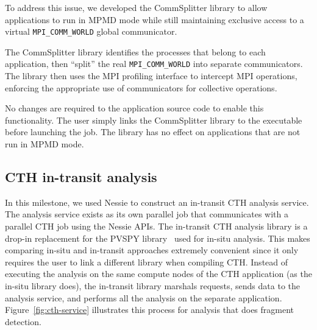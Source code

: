 To address this issue, we developed the CommSplitter library to allow
applications to run in MPMD mode while still maintaining exclusive access to a 
virtual \texttt{MPI\_COMM\_WORLD} global communicator.  

The CommSplitter library identifies the processes that belong to each
application, then ``split'' the real \texttt{MPI\_COMM\_WORLD} into separate
communicators.   The library then uses the MPI profiling interface to intercept
MPI operations, enforcing the appropriate use of communicators for
collective operations.

No changes are required to the application source code to enable this
functionality.  The user simply links the CommSplitter library to the executable
before launching the job.  The library has no effect on applications that are
not run in MPMD mode. 



\subsection{CTH in-transit analysis}

In this milestone, we used Nessie to construct an in-transit CTH analysis 
service.  The analysis service exists as its own parallel job 
that communicates with a parallel CTH job using the Nessie APIs.  
The in-transit CTH analysis library is a drop-in replacement
for the PVSPY library~\cite{moreland:2010:coprocessing-milestone} used for
in-situ analysis.  This makes comparing in-situ and in-transit approaches
extremely convenient since it only requires the user to link a different
library when compiling CTH.  Instead of executing the analysis on the 
same compute nodes of the CTH application (as the in-situ library does), the
in-transit library marshals requests, sends data to the analysis service, and
performs all the analysis on the separate application.
Figure~\ref{fig:cth-service} illustrates this process for analysis that does
fragment detection. 

